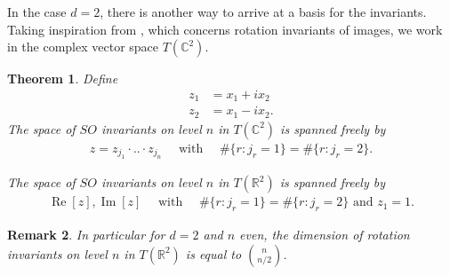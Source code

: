 \documentclass{scrartcl}
\newtheorem{theorem}{Theorem}
\theoremstyle{plain}
\newtheorem{remark}[theorem]{Remark}
\theoremstyle{definition}
\newcommand{\R}{\mathbb{R}}
\newcommand{\C}{\mathbb{C}}
\newcommand{\1}[1]{1_{\{#1\}}}
\newcommand{\ds}{d} %
\begin{document}
In the case $\ds=2$, there is another way to arrive at a basis for the invariants.
%
Taking inspiration from \cite{bib:Flu2000}, which concerns rotation invariants
of images, we work in the complex vector space $T(\C^2)$.
\begin{theorem}
  \label{thm:soInvariants}
  Define
  \begin{align*}
    z_1 &= x_1 + i x_2 \\
    z_2 &= x_1 - i x_2.
  \end{align*}
  The space of $SO$ invariants on level $n$ in $T(\C^2)$ is spanned freely by
  \begin{align*}
    z = z_{j_1} \cdot .. \cdot z_{j_n} \quad \text{ with } \quad \#\{ r : j_r = 1 \} = \#\{ r : j_r = 2 \}.
  \end{align*}


  The space of $SO$ invariants on level $n$ in $T(\R^2)$ is spanned freely by
  \begin{align*}
    \operatorname{Re}[ z ], \operatorname{Im}[ z ] \quad \text{ with } \quad \#\{ r : j_r = 1 \} = \#\{ r : j_r = 2 \} \text{ and } z_1 = 1.
  \end{align*}
\end{theorem}
\begin{remark}
  In particular for $\ds=2$ and $n$ even, the dimension of rotation invariants on level $n$ in $T(\R^2)$
  is equal to
  $\binom{n}{n/2}$.
\end{remark}
\end{document}
